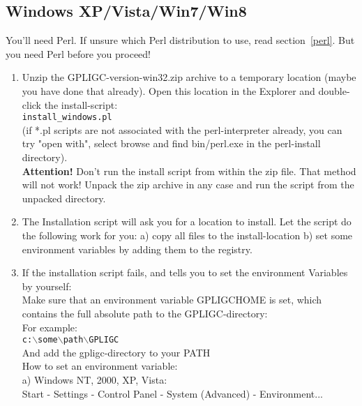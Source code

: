 \subsection{Windows XP/Vista/Win7/Win8}
\label{windows_install}


You'll need Perl. If unsure which Perl distribution to use, read section~\ref{perl}. But you need Perl before you proceed!

\begin{enumerate}
 
\item Unzip the GPLIGC-version-win32.zip archive to a temporary location
(maybe you have done that already).
Open this location in the Explorer and double-click the install-script: \\
\texttt{install\_windows.pl} \\
(if *.pl scripts are not associated with the perl-interpreter already,
you can try "open with", select browse and find bin/perl.exe in the
perl-install directory). \\
\textbf{Attention!} Don't run the install script from within the zip file. That method will not work!
Unpack the zip archive in any case and run the script from the unpacked directory.

\item The Installation script will ask you for a location to install.
Let the script do the following work for you:
a) copy all files to the install-location
b) set some environment variables by adding them to the registry.


\item If the installation script fails, and tells you to set the environment Variables
by yourself:\\
Make sure that an environment variable GPLIGCHOME is set,
which contains the full absolute path to the GPLIGC-directory:\\
For example: \\
\texttt{c:$\backslash$some$\backslash$path$\backslash$GPLIGC} \\
And add the gpligc-directory to your PATH \\
How to set an environment variable: \\
a) Windows NT, 2000, XP, Vista: \\
Start - Settings - Control Panel - System (Advanced) - Environment... \\


\end{enumerate}
